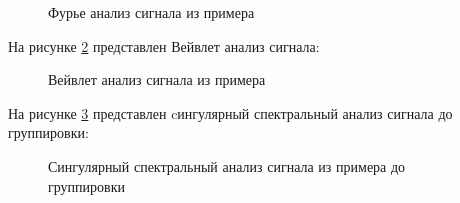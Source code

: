 \documentclass[a4paper,oneside,14pt]{extreport}
\begin{document}
\begin{figure}[!h]
	\caption{Фурье анализ сигнала из примера}
	\label{task1_fft1}
\end{figure}

На рисунке \ref{task1_vevlet1} представлен Вейвлет анализ сигнала:

\begin{figure}[!h]
	\caption{Вейвлет анализ сигнала из примера}
	\label{task1_vevlet1}
\end{figure}

\newpage
На рисунке \ref{task1_ssa1_not_grouped} представлен cингулярный спектральный анализ сигнала до группировки:

\begin{figure}[!h]
	\caption{Сингулярный спектральный анализ сигнала из примера до группировки}
	\label{task1_ssa1_not_grouped}
\end{figure}
\end{document}

